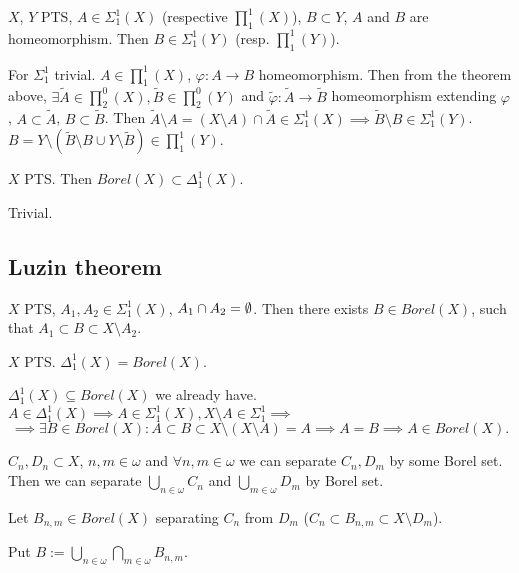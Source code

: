 \documentclass[12pt]{article}					%
\begin{document}
\begin{veta}
	$X$, $Y$ PTS, $A \in Σ_1^1(X)$ (respective $∏_1^1(X)$), $B \subset Y$, $A$ and $B$ are homeomorphism. Then $B \in Σ_1^1(Y)$ (resp. $∏_1^1(Y)$).

	\begin{dukazin}
		For $Σ_1^1$ trivial. $A \in ∏_1^1(X)$, $φ: A \rightarrow B$ homeomorphism. Then from the theorem above, $\exists \tilde A \in ∏_2^0(X), \tilde B \in ∏_2^0(Y)$ and $\tilde φ: \tilde A \rightarrow \tilde B$ homeomorphism extending $φ$, $A \subset \tilde A$, $B \subset \tilde B$. Then $\tilde A \setminus A = (X \setminus A) \cap \tilde A \in Σ_1^1(X) \implies \tilde B \setminus B \in Σ_1^1(Y)$. $B = Y \setminus (\tilde B \setminus B \cup Y \setminus \tilde B) \in ∏_1^1(Y)$.
	\end{dukazin}
\end{veta}

\begin{veta}
	$X$ PTS. Then $Borel(X) \subset Δ_1^1(X)$.
	
	\begin{dukazin}
		Trivial.
	\end{dukazin}
\end{veta}

\subsection{Luzin theorem}
\begin{veta}[Luzin]
	$X$ PTS, $A_1, A_2 \in Σ_1^1(X)$, $A_1 \cap A_2 = \emptyset$. Then there exists $B \in Borel(X)$, such that $A_1 \subset B \subset X \setminus A_2$.
\end{veta}

\begin{dusledek}
	$X$ PTS. $Δ_1^1(X) = Borel(X)$.

	\begin{dukazin}
		$Δ_1^1(X) \subseteq Borel(X)$ we already have. $A \in Δ_1^1(X) \implies A \in Σ_1^1(X), X \setminus A \in Σ_1^1 \implies$
		$$ \implies \exists B \in Borel(X): A \subset B \subset X \setminus (X \setminus A) = A \implies A = B \implies A \in Borel(X). $$
	\end{dukazin}
\end{dusledek}

\begin{lemma}
	$C_n, D_n \subset X$, $n, m \in ω$ and $\forall n, m \in ω$ we can separate $C_n, D_m$ by some Borel set. Then we can separate $\bigcup_{n \in ω}C_n$ and $\bigcup_{m \in ω} D_m$ by Borel set.

	\begin{dukazin}
		Let $B_{n, m} \in Borel(X)$ separating $C_n$ from $D_m$ ($C_n \subset B_{n, m} \subset X \setminus D_m$).

		Put $B := \bigcup_{n \in ω} \bigcap_{m \in ω} B_{n, m}$.
	\end{dukazin}
\end{lemma}
\end{document}
